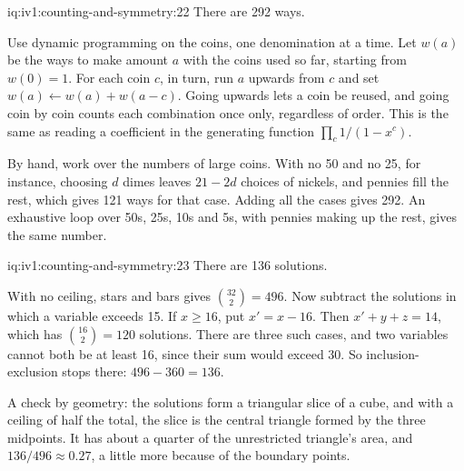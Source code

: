 \begin{solution}{iq:iv1:counting-and-symmetry:22}
There are 292 ways.

Use dynamic programming on the coins, one denomination at a time. Let $w(a)$ be the ways to make amount $a$ with the coins used so far, starting from $w(0) = 1$. For each coin $c$, in turn, run $a$ upwards from $c$ and set $w(a) \leftarrow w(a) + w(a - c)$. Going upwards lets a coin be reused, and going coin by coin counts each combination once only, regardless of order. This is the same as reading a coefficient in the generating function $\prod_c 1/(1 - x^c)$.

By hand, work over the numbers of large coins. With no 50 and no 25, for instance, choosing $d$ dimes leaves $21 - 2d$ choices of nickels, and pennies fill the rest, which gives 121 ways for that case. Adding all the cases gives 292. An exhaustive loop over 50s, 25s, 10s and 5s, with pennies making up the rest, gives the same number.

\end{solution}

\begin{solution}{iq:iv1:counting-and-symmetry:23}
There are 136 solutions.

With no ceiling, stars and bars gives $\binom{32}{2} = 496$. Now subtract the solutions in which a variable exceeds 15. If $x \ge 16$, put $x' = x - 16$. Then $x' + y + z = 14$, which has $\binom{16}{2} = 120$ solutions. There are three such cases, and two variables cannot both be at least 16, since their sum would exceed 30. So inclusion-exclusion stops there: $496 - 360 = 136$.

A check by geometry: the solutions form a triangular slice of a cube, and with a ceiling of half the total, the slice is the central triangle formed by the three midpoints. It has about a quarter of the unrestricted triangle's area, and $136/496 \approx 0.27$, a little more because of the boundary points.

\end{solution}

